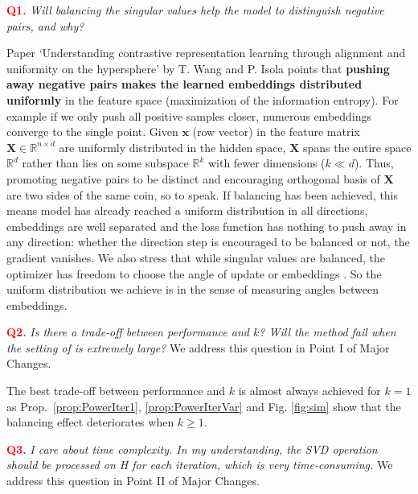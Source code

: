 \vspace{0.1cm} \noindent\textcolor{red}{\bf\textcolor{red}{Q1.}} {\em Will balancing the singular values help the model to distinguish negative pairs, and why?}

\noindent Paper `Understanding contrastive representation learning through alignment and uniformity on the hypersphere' by T. Wang and P. Isola points that \textbf{pushing away negative pairs makes the learned embeddings distributed uniformly} in the feature space (maximization of the information entropy). For example if we only push all positive samples closer, numerous embeddings converge to the single point. Given  $\mathbf{x}$ (row vector) in the feature matrix $\mathbf{X} \in \mathbb{R}^{n\times d}$ are uniformly distributed in the hidden space, $\mathbf{X}$ spans the entire space $\mathbb{R}^d$ rather than lies on some subspace $\mathbb{R}^k$ with fewer dimensions ($k\ll d$). Thus, promoting negative pairs to be distinct and encouraging orthogonal basis of $\mathbf{X}$ are two sides of the same coin, so to speak. If balancing has been achieved, this means model has already reached a uniform distribution in all directions, embeddings are well separated and the loss function has nothing to push away in any direction: whether the direction step is encouraged to be balanced or not, the gradient vanishes. We also stress that while singular values are balanced, the optimizer has freedom to choose the angle of update or embeddings . So the uniform distribution we achieve is in the sense of measuring angles between embeddings. 

\vspace{0.1cm} \noindent\textcolor{red}{\bf Q2.} {\em Is there a trade-off between performance and $k$? Will the method fail when the setting of is extremely large?} \noindent We address this question in {\color{blue}Point I} of {\color{blue}Major Changes}. 

The best trade-off between performance and $k$ is almost always achieved for $k=1$ as Prop.~\ref{prop:PowerIter1}, \ref{prop:PowerIterVar} and Fig. \ref{fig:sim} show that the balancing effect deteriorates when $k \geq 1$.

\vspace{0.1cm} \noindent\textcolor{red}{\textcolor{red}{\bf Q3.}} {\em I care about time complexity. In my understanding, the SVD operation should be processed on H for each iteration, which is very time-consuming.}
We address this question in {\color{blue}Point II} of {\color{blue}Major Changes}.

